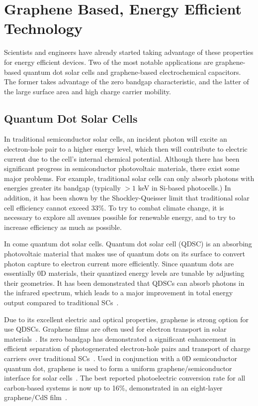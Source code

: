 \documentclass[10pt]{article}
\begin{document}
\section*{Graphene Based, Energy Efficient Technology}

Scientists and engineers have already started taking advantage of these properties for energy efficient devices. Two of the most notable applications are graphene-based quantum dot solar cells and graphene-based electrochemical capacitors. The former takes advantage of the zero bandgap characteristic, and the latter of the large surface area and high charge carrier mobility.

\subsection*{Quantum Dot Solar Cells}

In traditional semiconductor solar cells, an incident photon will excite an electron-hole pair to a higher energy level, which then will contribute to electric current due to the cell's internal chemical potential. Although there has been significant progress in semiconductor photovoltaic materials, there exist some major problems.
For example, traditional solar cells can only absorb photons with energies greater its bandgap (typically $>1$ keV in Si-based photocells.) In addition, it has been shown by the Shockley-Queisser limit that traditional solar cell efficiency cannot exceed 33\%.
To try to combat climate change, it is necessary to explore all avenues possible for renewable energy, and to try to increase efficiency as much as possible.

In come quantum dot solar cells. Quantum dot solar cell (QDSC) is an absorbing photovoltaic material that makes use of quantum dots on its surface to convert photon capture to electron current more efficiently. Since quantum dots are essentially 0D materials, their quantized energy levels are tunable by adjusting their geometries. It has been demonstrated that QDSCs can absorb photons in the infrared spectrum, which leads to a major improvement in total energy output compared to traditional SCs~\cite{Feng2012}.

Due to its excellent electric and optical properties, graphene is strong option for use QDSCs. Graphene films are often used for electron transport in solar materials~\cite{Guo2011}. Its zero bandgap has demonstrated a significant enhancement in efficient separation of photogenerated electron-hole pairs and transport of charge carriers over traditional SCs~\cite{Guo2011}. Used in conjunction with a 0D semiconductor quantum dot, graphene is used to form a uniform graphene/semiconductor interface for solar cells~\cite{Guo2011}. The best reported photoelectric conversion rate for all carbon-based systems is now up to 16\%, demonstrated in an eight-layer graphene/CdS film~\cite{Farrow2009}.
\end{document}
